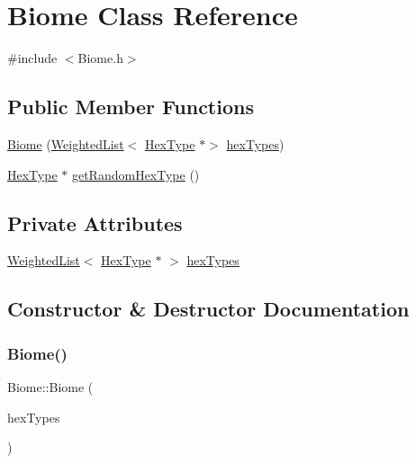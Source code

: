 \hypertarget{class_biome}{}\section{Biome Class Reference}
\label{class_biome}


{\ttfamily \#include $<$Biome.\+h$>$}

\subsection*{Public Member Functions}
\begin{DoxyCompactItemize}
\item 
\hyperlink{class_biome_af9c173136b7908a439a907c517a9022e}{Biome} (\hyperlink{class_weighted_list}{Weighted\+List}$<$ \hyperlink{class_hex_type}{Hex\+Type} $\ast$$>$ \hyperlink{class_biome_afa5cc88732d80e8093c9c090f8dfb042}{hex\+Types})
\item 
\hyperlink{class_hex_type}{Hex\+Type} $\ast$ \hyperlink{class_biome_a26e3282a969afa0f9a62d187c11cd62e}{get\+Random\+Hex\+Type} ()
\end{DoxyCompactItemize}
\subsection*{Private Attributes}
\begin{DoxyCompactItemize}
\item 
\hyperlink{class_weighted_list}{Weighted\+List}$<$ \hyperlink{class_hex_type}{Hex\+Type} $\ast$ $>$ \hyperlink{class_biome_afa5cc88732d80e8093c9c090f8dfb042}{hex\+Types}
\end{DoxyCompactItemize}


\subsection{Constructor \& Destructor Documentation}
\mbox{\label{class_biome_af9c173136b7908a439a907c517a9022e}} 
\subsubsection{\texorpdfstring{Biome()}{Biome()}}
{\footnotesize\ttfamily Biome\+::\+Biome (\begin{DoxyParamCaption}\item[{\hyperlink{class_weighted_list}{Weighted\+List}$<$ \hyperlink{class_hex_type}{Hex\+Type} $\ast$$>$}]{hex\+Types }\end{DoxyParamCaption})}



